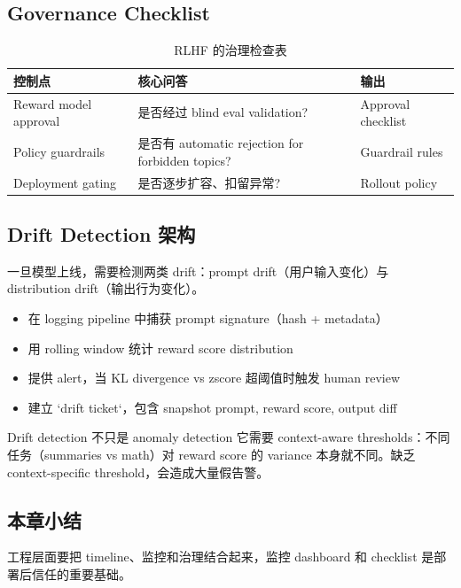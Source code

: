 \subsection{Governance Checklist}

\begin{table}[H]
\centering
\begin{tabular}{p{} p{} p{}}
\toprule
控制点 & 核心问答 & 输出 \\
\midrule
Reward model approval & 是否经过 blind eval validation? & Approval checklist \\
Policy guardrails & 是否有 automatic rejection for forbidden topics? & Guardrail rules \\
Deployment gating & 是否逐步扩容、扣留异常? & Rollout policy \\
\bottomrule
\end{tabular}
\caption{RLHF 的治理检查表}
\end{table}

\subsection{Drift Detection 架构}

一旦模型上线，需要检测两类 drift：prompt drift（用户输入变化）与 distribution drift（输出行为变化）。

\begin{itemize}
    \item 在 logging pipeline 中捕获 prompt signature（hash + metadata）
    \item 用 rolling window 统计 reward score distribution
    \item 提供 alert，当 KL divergence vs zscore 超阈值时触发 human review
    \item 建立 `drift ticket`，包含 snapshot prompt, reward score, output diff
\end{itemize}

\begin{knowledgebox}{Drift detection 不只是 anomaly detection}
它需要 context-aware thresholds：不同任务（summaries vs math）对 reward score 的 variance 本身就不同。缺乏 context-specific threshold，会造成大量假告警。
\end{knowledgebox}

\subsection{本章小结}

工程层面要把 timeline、监控和治理结合起来，监控 dashboard 和 checklist 是部署后信任的重要基础。
